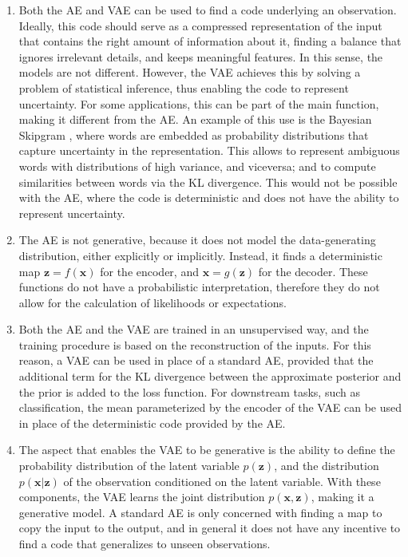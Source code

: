 \documentclass{article}
\begin{document}
\begin{enumerate}
\item Both the AE and VAE can be used to find a code underlying an observation. Ideally, this code should serve as a compressed representation of the input that contains the right amount of information about it, finding a balance that ignores irrelevant details, and keeps meaningful features. In this sense, the models are not different. However, the VAE achieves this by solving a problem of statistical inference, thus enabling the code to represent uncertainty. For some applications, this can be part of the main function, making it different from the AE. An example of this use is the Bayesian Skipgram \cite{bravzinskas2017embedding}, where words are embedded as probability distributions that capture uncertainty in the representation. This allows to represent ambiguous words with distributions of high variance, and viceversa; and to compute similarities between words via the KL divergence. This would not be possible with the AE, where the code is deterministic and does not have the ability to represent uncertainty.

\item The AE is not generative, because it does not model the data-generating distribution, either explicitly or implicitly. Instead, it finds a deterministic map $\mathbf{z} = f(\mathbf{x})$ for the encoder, and $\mathbf{x} = g(\mathbf{z})$ for the decoder. These functions do not have a probabilistic interpretation, therefore they do not allow for the calculation of likelihoods or expectations.

\item Both the AE and the VAE are trained in an unsupervised way, and the training procedure is based on the reconstruction of the inputs. For this reason, a VAE can be used in place of a standard AE, provided that the additional term for the KL divergence between the approximate posterior and the prior is added to the loss function. For downstream tasks, such as classification, the mean parameterized by the encoder of the VAE can be used in place of the deterministic code provided by the AE.

\item The aspect that enables the VAE to be generative is the ability to define the probability distribution of the latent variable $p(\mathbf{z})$, and the distribution $p(\mathbf{x}\vert\mathbf{z})$ of the observation conditioned on the latent variable. With these components, the VAE learns the joint distribution $p(\mathbf{x},\mathbf{z})$, making it a generative model. A standard AE is only concerned with finding a map to copy the input to the output, and in general it does not have any incentive to find a code that generalizes to unseen observations.
\end{enumerate}
\end{document}
